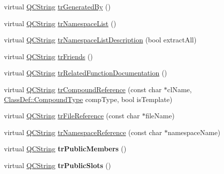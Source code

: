 \begin{DoxyCompactItemize}
virtual \mbox{\hyperlink{class_q_c_string}{Q\+C\+String}} \mbox{\hyperlink{class_translator_norwegian_a1f1ff1719d5b3892d666abadeed6ee74}{tr\+Generated\+By}} ()
\item 
virtual \mbox{\hyperlink{class_q_c_string}{Q\+C\+String}} \mbox{\hyperlink{class_translator_norwegian_a112cf9d7c4bf30cf4b08df6f955a147b}{tr\+Namespace\+List}} ()
\item 
virtual \mbox{\hyperlink{class_q_c_string}{Q\+C\+String}} \mbox{\hyperlink{class_translator_norwegian_a6f3d5dc20f9f7dff9c4f7cd0c81c8dab}{tr\+Namespace\+List\+Description}} (bool extract\+All)
\item 
virtual \mbox{\hyperlink{class_q_c_string}{Q\+C\+String}} \mbox{\hyperlink{class_translator_norwegian_a96f8017637d4f6ea626b0cfcbedff4f1}{tr\+Friends}} ()
\item 
virtual \mbox{\hyperlink{class_q_c_string}{Q\+C\+String}} \mbox{\hyperlink{class_translator_norwegian_a1d396db3adaa87cd7162d3997f4b0244}{tr\+Related\+Function\+Documentation}} ()
\item 
virtual \mbox{\hyperlink{class_q_c_string}{Q\+C\+String}} \mbox{\hyperlink{class_translator_norwegian_ac12c2d71889035d00a6f77d306139b5c}{tr\+Compound\+Reference}} (const char $\ast$cl\+Name, \mbox{\hyperlink{class_class_def_ae70cf86d35fe954a94c566fbcfc87939}{Class\+Def\+::\+Compound\+Type}} comp\+Type, bool is\+Template)
\item 
virtual \mbox{\hyperlink{class_q_c_string}{Q\+C\+String}} \mbox{\hyperlink{class_translator_norwegian_a495c2b1a87aa3714b8e5d9a67a836aed}{tr\+File\+Reference}} (const char $\ast$file\+Name)
\item 
virtual \mbox{\hyperlink{class_q_c_string}{Q\+C\+String}} \mbox{\hyperlink{class_translator_norwegian_a0537fbc1fa13ccd1fa75f890f067f2ca}{tr\+Namespace\+Reference}} (const char $\ast$namespace\+Name)
\item 
\mbox{\label{class_translator_norwegian_a510a13441d880ac22de6d3b2dc115de4}} 
virtual \mbox{\hyperlink{class_q_c_string}{Q\+C\+String}} {\bfseries tr\+Public\+Members} ()
\item 
\mbox{\label{class_translator_norwegian_ae5a7d43e7de39e96ea49e99621c80889}} 
virtual \mbox{\hyperlink{class_q_c_string}{Q\+C\+String}} {\bfseries tr\+Public\+Slots} ()
\item 
\mbox{\label{class_translator_norwegian_acab1a0e50b63fd901eba63f71536205c}} 

\end{DoxyCompactItemize}
